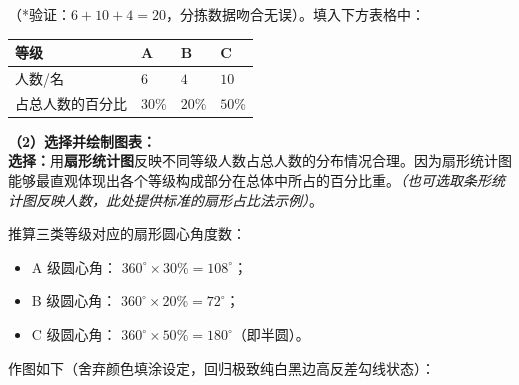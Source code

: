 （*验证：$6+10+4=20$，分拣数据吻合无误）。填入下方表格中：

\vspace{0.2cm}
\begin{center}
\renewcommand{\arraystretch}{1.5}
\begin{tabular}{|>{\centering\arraybackslash}p{3.4cm}|>{\centering\arraybackslash}p{3.4cm}|>{\centering\arraybackslash}p{3.4cm}|>{\centering\arraybackslash}p{3.4cm}|}
  \hline
  \cellcolor{gray!15} 等级 & A & B & C \\
  \hline
  \cellcolor{gray!15} 人数/名 & \textbf{$6$} & \textbf{$4$} & \textbf{$10$} \\
  \hline
  \cellcolor{gray!15} 占总人数的百分比 & \textbf{$30\%$} & \textbf{$20\%$} & \textbf{$50\%$} \\
  \hline
\end{tabular}
\end{center}
\vspace{0.4cm}

\textbf{（2）选择并绘制图表：} \\
\textbf{选择：}用\textbf{扇形统计图}反映不同等级人数占总人数的分布情况合理。因为扇形统计图能够最直观体现出各个等级构成部分在总体中所占的百分比重。\textit{（也可选取条形统计图反映人数，此处提供标准的扇形占比法示例）}。

推算三类等级对应的扇形圆心角度数：
\begin{itemize}
  \item A 级圆心角： $360^\circ \times 30\% = 108^\circ$；
  \item B 级圆心角： $360^\circ \times 20\% = 72^\circ$；
  \item C 级圆心角： $360^\circ \times 50\% = 180^\circ$（即半圆）。
\end{itemize}

作图如下（舍弃颜色填涂设定，回归极致纯白黑边高反差勾线状态）：

